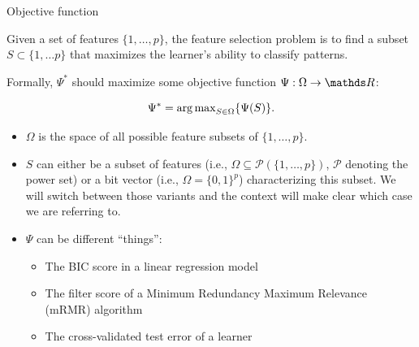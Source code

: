 \begin{vbframe}{Objective function}

\small

Given a set of features $\{1, \dots, p\}$, the feature selection problem is to find a subset $S \subset \{ 1, \dots p \}$ that
maximizes the learner's ability to classify patterns.

Formally, $\Psi^*$ should maximize some objective function
$\Psi: \Omega \rightarrow \R$:


$$\Psi^* = \operatorname{arg\,max}_{{S \in \Omega}} \{ \Psi(S) \}.$$

\begin{itemize}
\item $\Omega$ is the space of all possible feature subsets of $\{ 1, \dots, p \}$.

\item $S$ can either be a subset of features (i.e., $\Omega \subseteq \mathcal{P}(\{ 1, \dots, p \})$, $\mathcal{P}$ denoting the power set) or a bit vector (i.e., $\Omega = \{0, 1\}^p$) characterizing this subset. We will switch between those variants and the context will make clear which case we are referring to.

\item $\Psi$ can be different \enquote{things}:
  \begin{itemize}
  \small
    \item The BIC score in a linear regression model
    \item The filter score of a Minimum Redundancy Maximum Relevance (mRMR) algorithm
    \item The cross-validated test error of a learner
  
  \end{itemize}
\end{itemize}

\normalsize

\framebreak


\end{vbframe}
